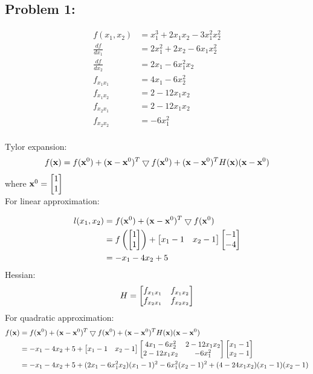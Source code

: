 \documentclass{article}
\begin{document}
 


\subsection*{Problem 1: }

\begin{align*} 
f(x_1, x_2) &= x_1^3 + 2x_1x_2 - 3x_1^2x_2^2 \\
\frac{df}{dx_1} &= 2x_1^2 + 2x_2 - 6x_1x_2^2 \\
\frac{df}{dx_2} & = 2x_1 -6x_1^2x_2   \\
f_{x_1x_1} & = 4x_1 -6x_2^2 \\
f_{x_1x_2} & = 2 - 12x_1x_2  \\
f_{x_2x_1} & = 2 - 12x_1x_2  \\
f_{x_2x_2} & = -6x_1^2 \\
\end{align*}

Tylor expansion: \\
\begin{align*} 
f(\vx) = f(\vx^0) + (\vx-\vx^0)^T\bigtriangledown f(\vx^0) + (\vx-\vx^0)^TH(\vx)(\vx-\vx^0) \\
\end{align*} 
where $\vx^0 = \bmat{1 \\ 1 }  $ \\
For linear approximation: 

\begin{align*} 
l(x_1, x_2) &  =  f(\vx^0) + (\vx-\vx^0)^T\bigtriangledown f(\vx^0) \\
& = f\left( \bmat{1\\ 1} \right) + \bmat{x_1-1 & x_2-1}\bmat{-1\\-4} \\
& = -x_1 -4x_2 + 5 \\
\end{align*}
Hessian: \\
\begin{align*} 
H = \bmat{f_{x_1x_1} & f_{x_1x_2} \\  f_{x_2x_1} & f_{x_2x_2} } 
\end{align*} 
For quadratic approximation: 
\begin{align*}
f(\vx) & = f(\vx^0) + (\vx-\vx^0)^T\bigtriangledown f(\vx^0) + (\vx-\vx^0)^TH(\vx)(\vx-\vx^0) \\
& = -x_1 -4x_2 + 5 + \bmat{x_1-1 & x_2 -1}\bmat{4x_1 -6x_2^2 & 2 - 12x_1x_2 \\ 2 - 12x_1x_2 & -6x_1^2 } \bmat{x_1-1 \\ x_2 -1 }   \\
& = -x_1 -4x_2 + 5  + (2x_1 - 6x_1^2x_2)(x_1-1)^2 - 6x_1^2(x_2-1)^2 + (4-24x_1x_2)(x_1-1)(x_2-1) \\ 
\end{align*}
\end{document}
